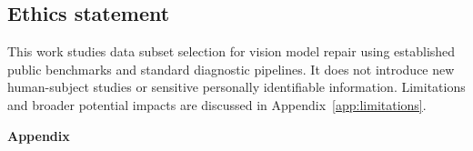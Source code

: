 \documentclass{article}
\begin{document}
\subsection*{Ethics statement}
This work studies data subset selection for vision model repair using established public benchmarks and standard diagnostic pipelines. It does not introduce new human-subject studies or sensitive personally identifiable information. Limitations and broader potential impacts are discussed in Appendix~\ref{app:limitations}.




\newpage
\appendix
\begin{center}
    \LARGE \textbf{Appendix}
    \vspace{1em}
\end{center}

\begin{tcolorbox}[
    colback=gray!2!white,
    colframe=gray!20!white,
    arc=4pt,
    boxrule=0.5pt,
    left=12pt, right=12pt, top=10pt, bottom=10pt,
    title=\textbf{Appendix Outline},
    coltitle=black,
    fonttitle=\bfseries\large,
    colbacktitle=gray!10!white,
    rounded corners,
    drop shadow
]
\startcontents[appendix]
\end{tcolorbox}
\vspace{2.5em}















\end{document}
